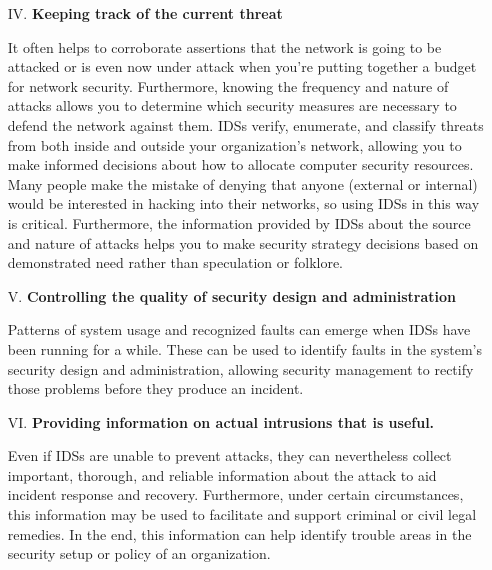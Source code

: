 \documentclass[12pt]{article}
\begin{document}
\begin{enumerate}
        \item[IV.] \textbf{Keeping track of the current threat}
        \par It often helps to corroborate assertions that the network is going to be attacked or is even now under attack when you're putting together a budget for network security. Furthermore, knowing the frequency and nature of attacks allows you to determine which security measures are necessary to defend the network against them. IDSs verify, enumerate, and classify threats from both inside and outside your organization's network, allowing you to make informed decisions about how to allocate computer security resources. Many people make the mistake of denying that anyone (external or internal) would be interested in hacking into their networks, so using IDSs in this way is critical. Furthermore, the information provided by IDSs about the source and nature of attacks helps you to make security strategy decisions based on demonstrated need rather than speculation or folklore.
        \\
        
        \item[V.] \textbf{Controlling the quality of security design and administration}
        \par Patterns of system usage and recognized faults can emerge when IDSs have been running for a while. These can be used to identify faults in the system's security design and administration, allowing security management to rectify those problems before they produce an incident.
        \\
        
        \item[VI.] \textbf{Providing information on actual intrusions that is useful.}
        \par Even if IDSs are unable to prevent attacks, they can nevertheless collect important, thorough, and reliable information about the attack to aid incident response and recovery. Furthermore, under certain circumstances, this information may be used to facilitate and support criminal or civil legal remedies. In the end, this information can help identify trouble areas in the security setup or policy of an organization.
        \\
        

\end{enumerate}
\end{document}
